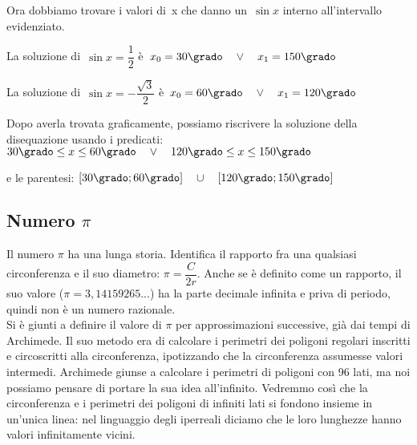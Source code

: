 \begin{esempio}
  Ora dobbiamo trovare i valori di~x che danno un~\(\sin x\) interno 
  all'intervallo evidenziato.
  
  La soluzione di~\(\sin x = \dfrac{1}{2}\) \quad
  è~\quad \(x_0 = 30 \grado \quad \vee \quad x_1 = 150 \grado\)
  
  La soluzione di~\(\sin x = -\dfrac{\sqrt{3}}{2}\) \quad
  è~\quad \(x_0 = 60 \grado \quad \vee \quad x_1 = 120 \grado\)
  
 \vspace{-6pt}
  \begin{center}
\begin{inaccessibleblock}
    
\end{inaccessibleblock}
  \end{center}

Dopo averla trovata graficamente, possiamo riscrivere la soluzione della 
disequazione usando i predicati:\quad 
\(30\grado \le x \le 60\grado \quad \vee \quad 
 120\grado \le x \le 150\grado\)

e le parentesi:\quad 
\(\left[30\grado ; 60\grado \right] \quad \cup \quad
 \left[120\grado ; 150\grado \right]\)
  
 \end{esempio}

\subsection{Numero \(\pi\)}
\label{subsubsec:insnum_pigreco}
Il numero \(\pi\) ha una lunga storia. Identifica 
il rapporto fra una qualsiasi circonferenza e il suo diametro: 
\(\pi=\dfrac{C}{2r}\). 
Anche se è definito come un rapporto, il suo valore (\(\pi=3,14159265...\)) 
ha la parte decimale infinita e priva di periodo, quindi non è un numero 
razionale.\\
Si è giunti a definire il valore di \(\pi\) per approssimazioni
successive, già dai tempi di Archimede. Il suo metodo era di
calcolare i perimetri dei poligoni regolari inscritti e
circoscritti alla circonferenza, ipotizzando che la circonferenza
assumesse valori intermedi. Archimede giunse a calcolare i perimetri
di poligoni con 96 lati, ma noi possiamo pensare di portare la sua idea
all'infinito. Vedremmo così che la circonferenza e i perimetri dei poligoni 
di infiniti lati si fondono insieme in un'unica linea: nel linguaggio degli
iperreali diciamo che le loro lunghezze hanno valori infinitamente vicini.

